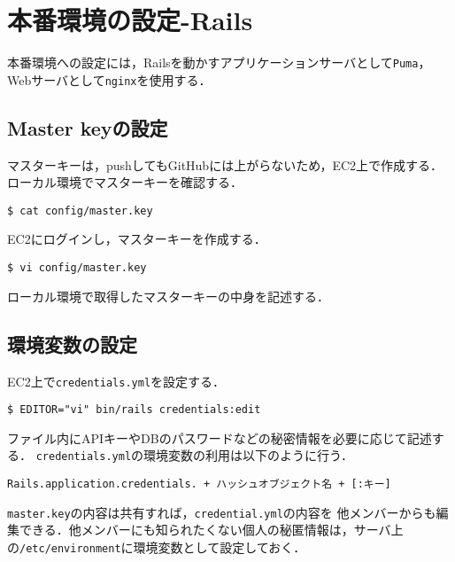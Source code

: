 \chapter{本番環境の設定-Rails}
本番環境への設定には，Railsを動かすアプリケーションサーバとして\texttt{Puma}，
Webサーバとして\texttt{nginx}を使用する．
\section{Master keyの設定}
{{マスター}}キーは，pushしてもGitHubには上がらないため，EC2上で作成する．
ローカル環境で{{マスター}}キーを確認する．
\begin{screen}
    \texttt{\$ cat config/master.key}
\end{screen}
EC2にログインし，{{マスター}}キーを作成する．
\begin{screen}
    \texttt{\$ vi config/master.key}
\end{screen}
ローカル環境で取得した{{マスター}}キーの中身を記述する．

\section{環境変数の設定}
EC2上で\texttt{credentials.yml}を設定する．
\begin{screen}
    \texttt{\$ EDITOR="vi" bin/rails credentials:edit}
\end{screen}
ファイル内にAPIキーやDBのパスワードなどの秘密情報を必要に応じて記述する．
\texttt{credentials.yml}の環境変数の利用は以下のように行う．
\begin{screen}
    \texttt{Rails.application.credentials. + ハッシュオブジェクト名 + [:キー]}
\end{screen}
\texttt{master.key}の内容は共有すれば，\texttt{credential.yml}の内容を
他メンバーからも編集できる．他メンバーにも知られたくない個人の秘匿情報は，サーバ上
の\texttt{/etc/environment}に環境変数として設定しておく．

